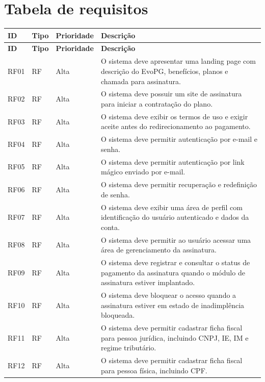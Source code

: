 \documentclass[
  12pt,
  openany,
  oneside,
  a4paper,
  brazil
]{abntex2}
\begin{document}
\section{Tabela de requisitos}
\renewcommand{\arraystretch}{1.2}
\begin{longtable}{>{\raggedright\arraybackslash}p{1.8cm} >{\raggedright\arraybackslash}p{1.8cm} >{\raggedright\arraybackslash}p{2cm} >{\raggedright\arraybackslash}p{8.8cm}}
\toprule
\textbf{ID} & \textbf{Tipo} & \textbf{Prioridade} & \textbf{Descri\c{c}\~ao} \\
\midrule
\endfirsthead
\toprule
\textbf{ID} & \textbf{Tipo} & \textbf{Prioridade} & \textbf{Descri\c{c}\~ao} \\
\midrule
\endhead
RF01 & RF & Alta & O sistema deve apresentar uma landing page com descri\c{c}\~ao do EvoPG, benef\'icios, planos e chamada para assinatura. \\
RF02 & RF & Alta & O sistema deve possuir um site de assinatura para iniciar a contrata\c{c}\~ao do plano. \\
RF03 & RF & Alta & O sistema deve exibir os termos de uso e exigir aceite antes do redirecionamento ao pagamento. \\
RF04 & RF & Alta & O sistema deve permitir autentica\c{c}\~ao por e-mail e senha. \\
RF05 & RF & Alta & O sistema deve permitir autentica\c{c}\~ao por link m\'agico enviado por e-mail. \\
RF06 & RF & Alta & O sistema deve permitir recupera\c{c}\~ao e redefini\c{c}\~ao de senha. \\
RF07 & RF & Alta & O sistema deve exibir uma \'area de perfil com identifica\c{c}\~ao do usu\'ario autenticado e dados da conta. \\
RF08 & RF & Alta & O sistema deve permitir ao usu\'ario acessar uma \'area de gerenciamento da assinatura. \\
RF09 & RF & Alta & O sistema deve registrar e consultar o status de pagamento da assinatura quando o m\'odulo de assinatura estiver implantado. \\
RF10 & RF & Alta & O sistema deve bloquear o acesso quando a assinatura estiver em estado de inadimpl\^encia bloqueada. \\
RF11 & RF & Alta & O sistema deve permitir cadastrar ficha fiscal para pessoa jur\'idica, incluindo CNPJ, IE, IM e regime tribut\'ario. \\
RF12 & RF & Alta & O sistema deve permitir cadastrar ficha fiscal para pessoa f\'isica, incluindo CPF. \\

\end{longtable}
\end{document}
